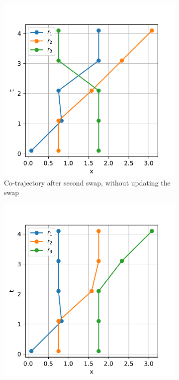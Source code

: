 \documentclass[12pt]{article}
\theoremstyle{definition}
\begin{document}
\begin{figure}
    \begin{subfigure}[t]{0.45\textwidth}
      \includegraphics[width=\textwidth]{swap-order-c.pdf}
      \caption{Co-trajectory after second swap, without updating the
        swap}
      \label{fig:swap-order-c}
    \end{subfigure}
    \begin{subfigure}[t]{0.45\textwidth}
      \includegraphics[width=\textwidth]{swap-order-d.pdf}

\end{subfigure}
\end{figure}
\end{document}
